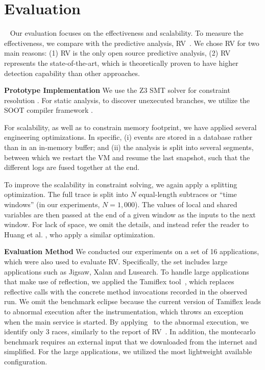 \section{Evaluation}~\label{sec:eval}
Our evaluation focuses on the effectiveness  and scalability.
To measure the effectiveness, we compare with the predictive analysis, 
{\sf RV}~\cite{pldi14}. We chose RV for two main reasons: (1) {\sf RV} is the 
only open source predictive analysis, (2) {\sf RV} represents the 
state-of-the-art, which is theoretically proven to have higher detection 
capability than other approaches. 

{\bf Prototype Implementation}  We use the Z3 SMT solver for constraint 
resolution \cite{MouraB08}. For static analysis, to discover unexecuted 
branches, we utilize the SOOT compiler framework \cite{Vallee-RaiCGHLS99}.

For scalability, as well as to constrain memory footprint, we have 
applied several engineering optimizations. In specific, (i) events are 
stored in a database rather than in an in-memory buffer; and (ii) the 
analysis is split into several segments, between which we restart 
the VM and resume the last snapshot, such that the different logs 
are fused together at the end. 

To improve the scalability in constraint solving, we again apply 
a splitting optimization. The full trace is split into $N$ equal-length 
subtraces or ``time windows'' (in our experiments, $N=1,000$). The values 
of local and shared variables are then passed at the end of a 
given window as the inputs to the next window. For lack of space, we 
omit the details, and instead refer the reader to 
Huang et al. \cite{pldi14}, who apply a similar optimization.


{\bf Evaluation Method} We conducted our experiments on a set of 16 
applications, which were also used to evaluate {\sf RV}. Specifically, 
the set includes large applications such as {\sf Jigsaw}, 
{\sf Xalan} and {\sf Lusearch}. To handle large applications that make 
use of reflection, we applied the {\sf Tamiflex} tool~\cite{tamiflex}, which 
replaces reflective calls with the concrete method invocations recorded 
in the observed run.
We omit the benchmark {\sf eclipse} because the current version 
of {\sf Tamiflex}  leads to abnormal execution after the instrumentation, 
which throws an exception when the main service is started. 
By applying \tool\  to the abnormal execution, we identify only 3 races, 
similarly to the report of RV~\cite{pldi14}.
In addition, the {\sf montecarlo} benchmark requires an external input 
that we downloaded from the internet and simplified. For the large 
applications, we utilized the most lightweight available configuration.


